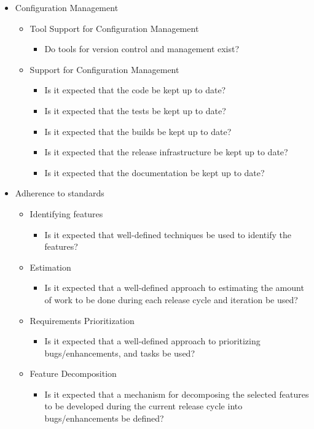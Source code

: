\begin{appendices}
\begin{itemize}
	\item Configuration Management
		\begin{itemize}
			\item Tool Support for Configuration Management
				\begin{itemize}
					\item Do tools for version control and management exist?
				\end{itemize}
			\item Support for Configuration Management
				\begin{itemize}
					\item Is it expected that the code be kept up to date?
					\item Is it expected that the tests be kept up to date?
					\item Is it expected that the builds be kept up to date?
					\item Is it expected that the release infrastructure be kept up to date?
					\item Is it expected that the documentation be kept up to date?
				\end{itemize}
		\end{itemize}
	\item Adherence to standards
		\begin{itemize}
			\item Identifying features
				\begin{itemize}
					\item Is it expected that well-defined techniques be used to identify the features?
					\end{itemize}
			\item Estimation
				\begin{itemize}
					\item Is it expected that a well-defined approach to estimating the amount of work to be done during each release cycle and iteration be used?
				\end{itemize}
			\item Requirements Prioritization
				\begin{itemize}
					\item Is it expected that a well-defined approach to prioritizing bugs/enhancements, and tasks be used?
				\end{itemize}	
			\item Feature Decomposition
				\begin{itemize}
					\item Is it expected that a mechanism for decomposing the selected features to be developed during the current release cycle into bugs/enhancements be defined?

\end{itemize}
\end{itemize}
\end{itemize}
\end{appendices}

